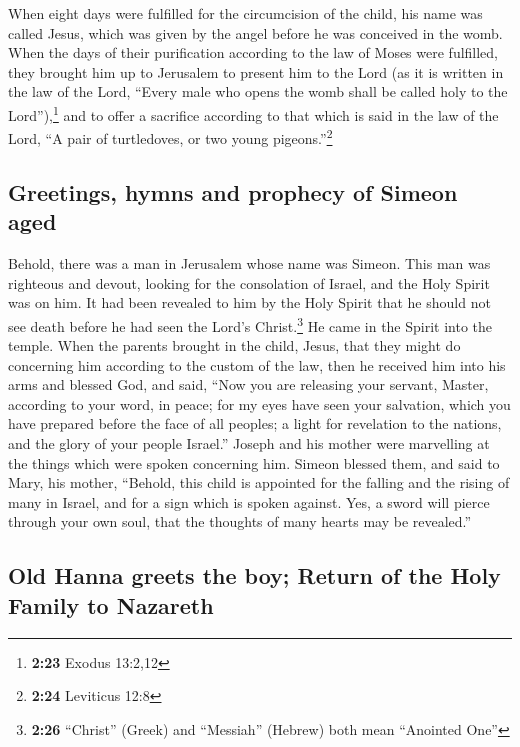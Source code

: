  When eight days were fulfilled for the circumcision of
the child, his name was called Jesus, which was given by the angel
before he was conceived in the womb.  When the days of
their purification according to the law of Moses were fulfilled, they
brought him up to Jerusalem to present him to the Lord 
(as it is written in the law of the Lord, ``Every male who opens the
womb shall be called holy to the Lord''),\footnote{\textbf{2:23} Exodus
  13:2,12}  and to offer a sacrifice according to that
which is said in the law of the Lord, ``A pair of turtledoves, or two
young pigeons.''\footnote{\textbf{2:24} Leviticus 12:8}

\hypertarget{greetings-hymns-and-prophecy-of-simeon-aged}{%
\subsection{Greetings, hymns and prophecy of Simeon
aged}\label{greetings-hymns-and-prophecy-of-simeon-aged}}

 Behold, there was a man in Jerusalem whose name was
Simeon. This man was righteous and devout, looking for the consolation
of Israel, and the Holy Spirit was on him.  It had been
revealed to him by the Holy Spirit that he should not see death before
he had seen the Lord's Christ.\footnote{\textbf{2:26} ``Christ'' (Greek)
  and ``Messiah'' (Hebrew) both mean ``Anointed One''} 
He came in the Spirit into the temple. When the parents brought in the
child, Jesus, that they might do concerning him according to the custom
of the law,  then he received him into his arms and
blessed God, and said,  ``Now you are releasing your
servant, Master, according to your word, in peace;  for
my eyes have seen your salvation,  which you have
prepared before the face of all peoples;  a light for
revelation to the nations, and the glory of your people Israel.''
 Joseph and his mother were marvelling at the things
which were spoken concerning him.  Simeon blessed them,
and said to Mary, his mother, ``Behold, this child is appointed for the
falling and the rising of many in Israel, and for a sign which is spoken
against.  Yes, a sword will pierce through your own soul,
that the thoughts of many hearts may be revealed.''

\hypertarget{old-hanna-greets-the-boy-return-of-the-holy-family-to-nazareth}{%
\subsection{Old Hanna greets the boy; Return of the Holy Family to
Nazareth}\label{old-hanna-greets-the-boy-return-of-the-holy-family-to-nazareth}}

